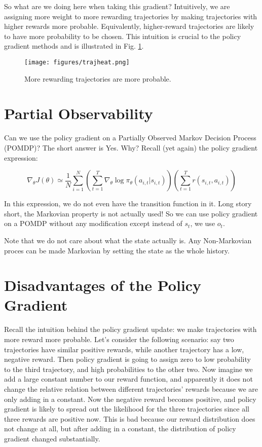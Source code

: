 So what are we doing here when taking this gradient? Intuitively, we are assigning more weight to more rewarding trajectories by making trajectories with higher rewards more probable. Equivalently, higher-reward trajectories are likely to have more probability to be chosen. This intuition is crucial to the policy gradient methods and is illustrated in Fig. \ref{fig:trajheat}.
\begin{figure}
    \centering
    \texttt{[image: figures/trajheat.png]}
    \caption{More rewarding trajectories are more probable.}
    \label{fig:trajheat}
\end{figure}

\section{Partial Observability}
Can we use the policy gradient on a Partially Observed Markov Decision Process (POMDP)? The short answer is Yes. Why? Recall (yet again) the policy gradient expression:

$$\nabla_\theta J(\theta) \simeq \frac{1}{N}\sum_{i=1}^N\left(\sum_{t=1}^T\nabla_\theta \log\pi_\theta(a_{i,t}|s_{i,t})\right)\left(\sum_{t=1}^T r(s_{i,t},a_{i,t})\right)$$

In this expression, we do not even have the transition function in it. Long story short, the Markovian property is not actually used! So we can use policy gradient on a POMDP without any modification except instead of $s_t$, we use $o_t$.

Note that we do not care about what the state actually is. Any Non-Markovian proces can be made Markovian by setting the state as the whole history. 

\section{Disadvantages of the Policy Gradient}
Recall the intuition behind the policy gradient update: we make trajectories with more reward more probable. Let's consider the following scenario: say two trajectories have similar positive rewards, while another trajectory has a low, negative reward. Then policy gradient is going to assign zero to low probability to the third trajectory, and high probabilities to the other two. Now imagine we add a large constant number to our reward function, and apparently it does not change the relative relation between different trajectories' rewards because we are only adding in a constant. Now the negative reward becomes positive, and policy gradient is likely to spread out the likelihood for the three trajectories since all three rewards are positive now. This is bad because our reward distribution does not change at all, but after adding in a constant, the distribution of policy gradient changed substantially. 

